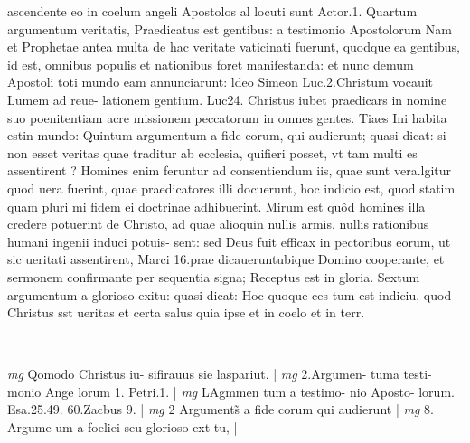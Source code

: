 \documentclass{article}
\begin{document}
\begin{pages}
ascendente eo in coelum angeli Apostolos al locuti sunt Actor.1.  \pend\pstart Quartum argumentum veritatis, Praedicatus est gentibus: a testimonio Apostolorum Nam et Prophetae antea multa de hac veritate vaticinati fuerunt, quodque ea gentibus, id est, omnibus populis et nationibus foret manifestanda: et nunc demum Apostoli toti mundo eam annunciarunt: ldeo Simeon Luc.2.Christum vocauit Lumem ad reue- lationem gentium. Luc24. Christus iubet praedicars in nomine suo poenitentiam acre missionem peccatorum in omnes gentes.  \pend\pstart Tiaes Ini habita estin mundo: Quintum argumentum a fide eorum, qui audierunt; quasi dicat: si non esset veritas quae traditur ab ecclesia, quifieri posset, vt tam multi es assentirent ? Homines enim feruntur ad consentiendum iis, quae sunt vera.lgitur quod uera fuerint, quae praedicatores illi docuerunt, hoc indicio est, quod statim quam pluri mi fidem ei doctrinae adhibuerint. Mirum est quôd homines illa credere potuerint de Christo, ad quae alioquin nullis armis, nullis rationibus humani ingenii induci potuis- sent: sed Deus fuit efficax in pectoribus eorum, ut sic ueritati assentirent, Marci 16.prae dicaueruntubique Domino cooperante, et sermonem confirmante per sequentia signa; Receptus est in gloria. Sextum argumentum a glorioso exitu: quasi dicat: Hoc quoque ces tum est indiciu, quod Christus sst ueritas et certa salus quia ipse et in coelo et in terr.  \pend
\vspace{0.5cm}\noindent
\vspace{0.2cm}\rule{1cm}{0.2pt}\\ 
\hspace{0.2cm}\textit{mg}
\footnotesize Qomodo Christus iu- sifirauus sie laspariut. 
\normalsize| 
\hspace{0.2cm}\textit{mg}
\footnotesize 2.Argumen- tuma testi- monio Ange lorum 1. Petri.1. 
\normalsize| 
\hspace{0.2cm}\textit{mg}
\footnotesize LAgmmen tum a testimo- nio Aposto- lorum. Esa.25.49. 60.Zacbus 9. 
\normalsize| 
\hspace{0.2cm}\textit{mg}
\footnotesize 2 Arguments̃ a fide corum qui audierunt 
\normalsize| 
\hspace{0.2cm}\textit{mg}
\footnotesize 8. Argume um a foeliei seu glorioso ext tu, 
\normalsize| 

\end{pages}
\end{document}
